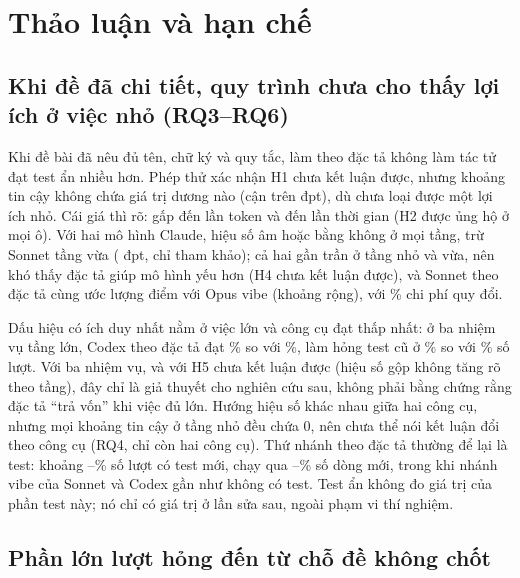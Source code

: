 \section{Thảo luận và hạn chế}\label{sec:discussion}

\subsection{Khi đề đã chi tiết, quy trình chưa cho thấy lợi ích ở việc nhỏ (RQ3--RQ6)}

Khi đề bài đã nêu đủ tên, chữ ký và quy tắc, làm theo đặc tả không làm tác tử đạt test ẩn nhiều hơn. Phép
thử xác nhận H1 chưa kết luận được, nhưng khoảng tin cậy không chứa giá trị dương nào (cận trên
\NumResHOneHighPp{} đpt), dù chưa loại được một lợi ích nhỏ. Cái giá thì rõ: gấp \NumResTokenRatioMin{} đến \NumResTokenRatioMax{} lần token
và \NumResWallRatioMin{} đến \NumResWallRatioMax{} lần thời gian (H2 được ủng hộ ở mọi ô). Với hai mô hình
Claude, hiệu số âm hoặc bằng không ở mọi tầng, trừ Sonnet tầng vừa
(\NumResSonnetMediumDiffPp{} đpt, chỉ tham khảo); cả hai gần trần ở tầng nhỏ và vừa, nên khó thấy đặc tả
giúp mô hình yếu hơn (H4 chưa kết luận được), và Sonnet theo đặc tả cùng ước lượng điểm với Opus vibe (khoảng rộng), với
\NumResHFourCostRatioPct{}\% chi phí quy đổi.

Dấu hiệu có ích duy nhất nằm ở việc lớn và công cụ đạt thấp nhất: ở ba nhiệm vụ tầng lớn, Codex theo đặc
tả đạt \NumResCodexLargeSpecPct{}\% so với \NumResCodexLargeVibePct{}\%, làm hỏng test cũ ở
\NumResCodexLargeRegSpecPct{}\% so với \NumResCodexLargeRegVibePct{}\% số lượt. Với ba nhiệm vụ, và với
H5 chưa kết luận được (hiệu số gộp không tăng rõ theo tầng), đây chỉ là giả thuyết cho nghiên cứu sau, không
phải bằng chứng rằng đặc tả ``trả vốn'' khi việc đủ lớn. Hướng hiệu số khác nhau giữa hai công cụ,
nhưng mọi khoảng tin cậy ở tầng nhỏ đều chứa 0, nên chưa thể nói kết luận đổi theo công cụ (RQ4, chỉ còn
hai công cụ). Thứ nhánh theo đặc tả thường để lại là test: khoảng \NumResSonnetSpecTestsAnyPct{}--\NumResCodexSpecTestsAnyPct{}\% số lượt có test mới, chạy qua \NumResSonnetSpecCovPct{}--\NumResOpusSpecCovPct{}\%
số dòng mới, trong khi nhánh vibe của Sonnet và Codex gần như không có test. Test ẩn không đo giá trị của
phần test này; nó chỉ có giá trị ở lần sửa sau, ngoài phạm vi thí nghiệm.

\subsection{Phần lớn lượt hỏng đến từ chỗ đề không chốt}

